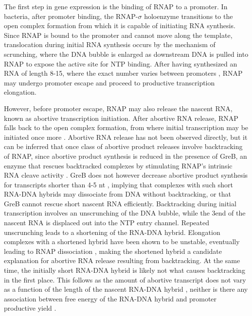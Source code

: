 %
The first step in gene expression is the binding of RNAP to a promoter. In
bacteria, after promoter binding, the RNAP-$\sigma$ holoenzyme transitions to
the open complex formation from which it is capable of initiating RNA
synthesis. Since RNAP is bound to the promoter and cannot move along the
template, translocation during initial RNA synthesis occurs by the mechanism
of scrunching, where the DNA bubble is enlarged as downstream DNA is pulled
into RNAP to expose the active site for NTP binding. After having synthesized
an RNA of length 8-15, where the exact number varies between promoters
\cite{carpousis_cycling_1980,hsu_vitro_2003,tang_real-time_2009,hsu_initial_2006},
RNAP may undergo promoter escape and proceed to productive transcription
elongation.

However, before promoter escape, RNAP may also release the nascent RNA, known
as abortive transcription initiation. After abortive RNA release, RNAP falls
back to the open complex formation, from where initial transcription may be
initiated once more \cite{carpousis_cycling_1980}. Abortive RNA release has
not been observed directly, but it can be inferred that once class of abortive
product releases involve backtracking of RNAP, since abortive product
synthesis is reduced in the presence of GreB, an enzyme that rescues
backtracked complexes by stimulating RNAP's intrinsic RNA cleave activity
\cite{hsu_escherichia_1995,feng_grea-induced_1994,hsu_initial_2006}. GreB does
not however decrease abortive product synthesis for transcripts shorter than
4-5 nt \cite{hsu_initial_2006}, implying that complexes with such short
RNA-DNA hybrids may dissociate from DNA without backtracking, or that GreB
cannot rescue short nascent RNA efficiently. Backtracking during initial
transcription involves an unscrunching of the DNA bubble, while the 3\ppp end
of the nascent RNA is displaced out into the NTP entry channel. Repeated
unscrunching leads to a shortening of the RNA-DNA hybrid. Elongation
complexes with a shortened hybrid have been shown to be unstable, eventually
leading to RNAP dissociation \cite{nudler_rnadna_1997}, making the shortened
hybrid a candidate explanation for abortive RNA release resulting from
backtracking. At the same time, the initially short RNA-DNA hybrid is
likely not what causes backtracking in the first place. This follows as the
amount of abortive transcript does not vary as a function of the length of the
nascent RNA-DNA hybrid \cite{hsu_initial_2006}, neither is there any association
between free energy of the RNA-DNA hybrid and promoter productive yield
\cite{skancke_sequence-dependent_2015}.

